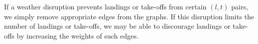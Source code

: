 If a weather disruption prevents landings or take-offs from certain $(l,t)$ pairs, we simply remove appropriate edges from the graphs. If this disruption limits the number of landings or take-offs, we may be able to discourage landings or take-offs by increasing the weights of such edges.